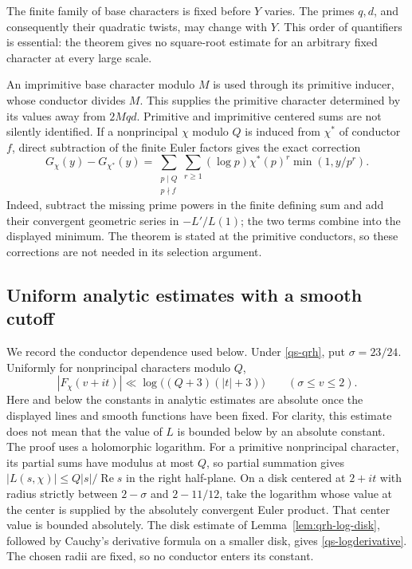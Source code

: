 The finite family of base characters is fixed before $Y$ varies.
The primes $q,d$, and consequently their quadratic twists, may change
with $Y$. This order of quantifiers is essential: the theorem gives
no square-root estimate for an arbitrary fixed character at every
large scale.

An imprimitive base character modulo $M$ is used through its primitive
inducer, whose conductor divides $M$. This supplies the primitive
character determined by its values away from $2Mqd$.
Primitive and imprimitive centered sums are not silently identified.
If a nonprincipal $\chi$ modulo $Q$ is induced from $\chi^*$ of
conductor $f$, direct subtraction of the finite Euler factors gives
the exact correction
\[
 G_\chi(y)-G_{\chi^*}(y)=
 \sum_{\substack{p\mid Q\\p\nmid f}}
   \sum_{r\ge1}(\log p)\chi^*(p)^r\min(1,y/p^r).
\]
Indeed, subtract the missing prime powers in the finite defining sum
and add their convergent geometric series in $-L'/L(1)$; the two
terms combine into the displayed minimum. The theorem is stated
at the primitive conductors, so these corrections are not needed
in its selection argument.

\subsection{Uniform analytic estimates with a smooth cutoff}

We record the conductor dependence used below. Under
\eqref{qs-qrh}, put $\sigma=23/24$. Uniformly for nonprincipal
characters modulo $Q$,
\begin{equation}\label{qs-logderivative}
 |F_\chi(v+it)|\ll\log\bigl((Q+3)(|t|+3)\bigr)
       \qquad(\sigma\le v\le2).
\end{equation}
Here and below the constants in analytic estimates are absolute once
the displayed lines and smooth functions have been fixed. For clarity,
this estimate does not mean that the value of $L$ is bounded below by
an absolute constant. The proof uses a holomorphic logarithm. For a
primitive nonprincipal character, its partial sums have modulus at
most $Q$, so partial summation gives
$|L(s,\chi)|\le Q|s|/\operatorname{Re}s$ in the right half-plane.
On a disk centered at $2+it$ with radius strictly between
$2-\sigma$ and $2-11/12$, take the logarithm whose value at the
center is supplied by the absolutely convergent Euler product.
That center value is bounded absolutely. The disk estimate of
Lemma~\ref{lem:qrh-log-disk}, followed by Cauchy's derivative
formula on a smaller disk, gives \eqref{qs-logderivative}.
The chosen radii are fixed, so no conductor enters its constant.

